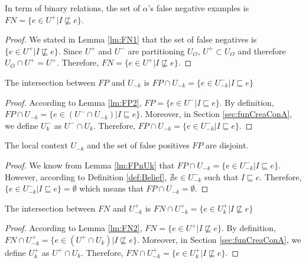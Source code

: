 \begin{lemma}\label{lm:FN2}
In term of binary relations, the set of $\alpha$'s false negative examples is $FN = \{ e \in U^{+} | I \not \sqsubseteq e \}$.
\end{lemma}

\begin{proof}
We stated in Lemma \ref{lm:FN1} that the set of false negatives is $\{ e \in U^{+} | I \not \sqsubseteq e \}$. Since $U^{+}$ and $U^{-}$ are partitioning $U_{O}$, $U^{+} \subset U_{O}$ and therefore $U_{O} \cap U^{+} = U^{+}$. Therefore, $FN = \{ e \in U^{+} | I \not \sqsubseteq e \}$.
\end{proof}

\begin{lemma}\label{lm:FPnUk}
The intersection between $FP$ and $U_{-k}$ is $FP \cap U_{-k} = \{e \in U^{-}_{-k} | I \sqsubseteq e \}$
\end{lemma}

\begin{proof}
According to Lemma \ref{lm:FP2}, $FP = \{ e \in U^{-} | I \sqsubseteq e \}$. By definition, $FP \cap U_{-k} = \{e \in (U^{-} \cap U_{-k}) | I \sqsubseteq e \}$. Moreover, in Section \ref{sec:funCreaConA}, we define $U^{-}_{k}$ as $U^{-} \cap U_{k}$. Therefore, $FP \cap U_{-k} = \{e \in U^{-}_{-k} | I \sqsubseteq e \}$.
\end{proof}

\begin{lemma}\label{lm:FPdisUo}
The local context $U_{-k}$ and the set of false positives $FP$ are disjoint.
\end{lemma}

\begin{proof}
We know from Lemma \ref{lm:FPnUk} that $FP \cap U_{-k} = \{e \in U^{-}_{-k} | I \sqsubseteq e \}$. However, according to Definition \ref{def:Belief}, $\nexists e \in U^{-}_{-k}$ such that $I \sqsubseteq e$. Therefore, $\{e \in U^{-}_{-k} | I \sqsubseteq e \} = \emptyset$ which means that $FP \cap U_{-k} = \emptyset$.
\end{proof}

\begin{lemma}\label{lm:FNnUk}
The intersection between $FN$ and $U^{+}_{-k}$ is $FN \cap U^{+}_{-k} = \{e \in U^{+}_{k} | I \not \sqsubseteq e \}$
\end{lemma}

\begin{proof}
According to Lemma \ref{lm:FN2}, $FN = \{ e \in U^{+} | I \not \sqsubseteq e \}$. By definition, $FN \cap U^{+}_{-k} = \{e \in (U^{+} \cap U_{k}) | I \not \sqsubseteq e \}$. Moreover, in Section \ref{sec:funCreaConA}, we define $U^{+}_{k}$ as $U^{+} \cap U_{k}$. Therefore, $FN \cap U^{+}_{-k} = \{e \in U^{+}_{k} | I \not \sqsubseteq e \}$.
\end{proof}


